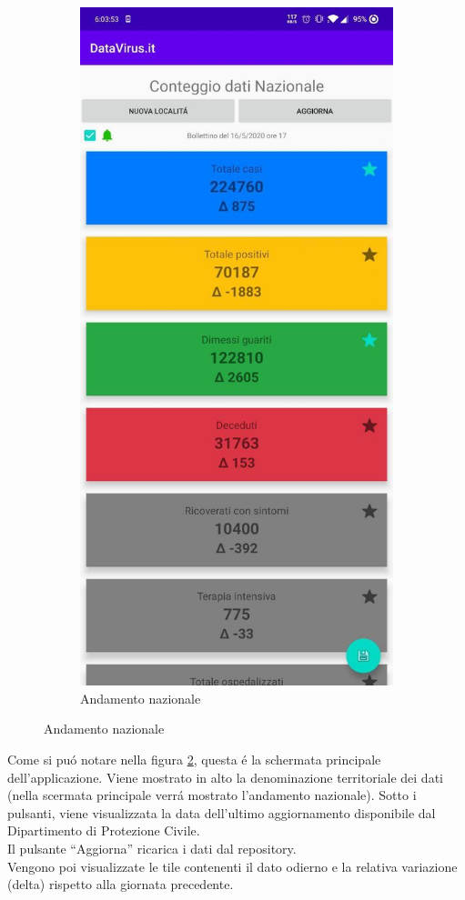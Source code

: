 \documentclass{article}
\newcommand{\quotes}[1]{``#1''}
\begin{document}
\begin{figure}[h]
\begin{subfigure}{.5\textwidth}
          \includegraphics[width=.7\linewidth]{main_activity.jpg}
          \caption{Andamento nazionale}
          \label{fig1:sub2}
        \end{subfigure}
    \end{figure}
    
    Come si puó notare nella figura \ref{fig1:sub2}, questa é la schermata principale dell'applicazione. 
    Viene mostrato in alto la denominazione territoriale dei dati (nella scermata principale verrá mostrato l'andamento nazionale). Sotto i pulsanti, viene visualizzata la data dell'ultimo aggiornamento disponibile dal Dipartimento di Protezione Civile.
    \\
    Il pulsante \quotes{Aggiorna} ricarica i dati dal repository.
    \\
    Vengono poi visualizzate le tile contenenti il dato odierno e la relativa variazione (delta) rispetto alla giornata precedente.
    \\
    
\end{document}
